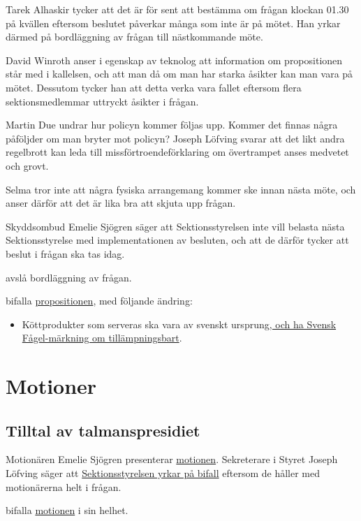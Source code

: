 \documentclass[hidelinks]{sektionsmote}
\begin{document}
Tarek Alhaskir tycker att det är för sent att bestämma om frågan klockan 01.30 på kvällen eftersom beslutet påverkar många som inte är på mötet.
Han yrkar därmed på bordläggning av frågan till nästkommande möte.

David Winroth anser i egenskap av teknolog att information om propositionen står med i kallelsen, och att man då om man har starka åsikter kan man vara på mötet. Dessutom tycker han att detta verka vara fallet eftersom flera sektionsmedlemmar uttryckt åsikter i frågan.

Martin Due undrar hur policyn kommer följas upp.
Kommer det finnas några påföljder om man bryter mot policyn?
Joseph Löfving svarar att det likt andra regelbrott kan leda till missförtroendeförklaring om övertrampet anses medvetet och grovt.

Selma tror inte att några fysiska arrangemang kommer ske innan nästa möte, och anser därför att det är lika bra att skjuta upp frågan.

Skyddsombud Emelie Sjögren säger att Sektionsstyrelsen inte vill belasta nästa Sektionsstyrelse med implementationen av besluten, och att de därför tycker att beslut i frågan ska tas idag.

\begin{beslut}
  \item avslå bordläggning av frågan.
  \item bifalla \hyperlink{bilagor/prop/d.pdf.1}{propositionen}, med följande ändring:
  \begin{itemize}
    \item Köttprodukter som serveras ska vara av svenskt ursprung\uline{, och ha Svensk Fågel-märkning om tillämpningsbart}.
  \end{itemize}
\end{beslut}


\section{Motioner}
\subsection{Tilltal av talmanspresidiet}
Motionären Emelie Sjögren presenterar \hyperlink{bilagor/motion/a.pdf.1}{motionen}.
Sekreterare i Styret Joseph Löfving säger att \hyperlink{bilagor/motion/asvar.pdf.1}{Sektionsstyrelsen yrkar på bifall} eftersom de håller med motionärerna helt i frågan.

\begin{beslut}
  \item bifalla \hyperlink{bilagor/motion/a.pdf.1}{motionen} i sin helhet.
\end{beslut}
\end{document}
